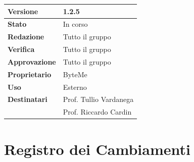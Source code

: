 \documentclass[11pt,a4paper]{article}
\begin{document}
\begin{titlepage}
    \begin{table}[H]
        \centering
        \begin{tabular}{|l|p{5cm}|}
            \hline
            \textbf{Versione} & 1.2.5 \\
            \hline
            \textbf{Stato} & In corso \\
            \hline
            \textbf{Redazione} & Tutto il gruppo \\
            \hline
            \textbf{Verifica} & Tutto il gruppo \\
            \hline
            \textbf{Approvazione} & Tutto il gruppo \\
            \hline
            \textbf{Proprietario} & ByteMe \\
            \hline
            \textbf{Uso} & Esterno \\
            \hline
            \textbf{Destinatari} & Prof. Tullio Vardanega \\ & Prof. Riccardo Cardin \\
            \hline
        \end{tabular}
    \end{table}
    
    \vfill
\end{titlepage}

\thispagestyle{empty}
\section*{Registro dei Cambiamenti}
\end{document}
